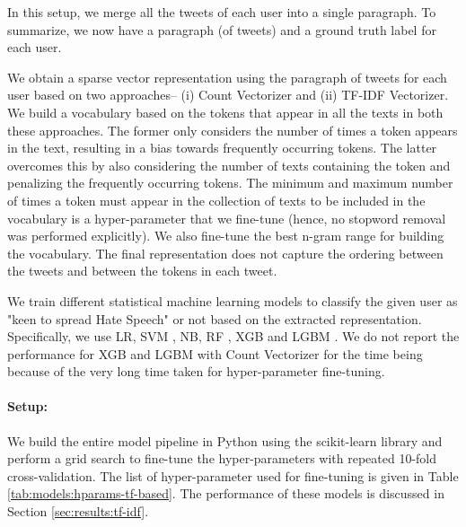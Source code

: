 In this setup, we merge all the tweets of each user into a single paragraph. To summarize, we now have a paragraph (of tweets) and a ground truth label for each user.

We obtain a sparse vector representation using the paragraph of tweets for each user based on two approaches-- (i) Count Vectorizer and (ii) \ac{TF-IDF} Vectorizer. We build a vocabulary based on the tokens that appear in all the texts in both these approaches. The former only considers the number of times a token appears in the text, resulting in a bias towards frequently occurring tokens. The latter overcomes this by also considering the number of texts containing the token and penalizing the frequently occurring tokens. The minimum and maximum number of times a token must appear in the collection of texts to be included in the vocabulary is a hyper-parameter that we fine-tune (hence, no stopword removal was performed explicitly). We also fine-tune the best n-gram range for building the vocabulary. The final representation does not capture the ordering between the tweets and between the tokens in each tweet.

We train different statistical machine learning models to classify the given user as "keen to spread Hate Speech" or not based on the extracted representation. Specifically, we use \ac{LR}, \ac{SVM} \cite{svm}, \ac{NB}, \ac{RF} \cite{rf}, \ac{XGB} \cite{xgboost} and \ac{LGBM} \cite{lightgbm}. We do not report the performance for \ac{XGB} and \ac{LGBM} with Count Vectorizer for the time being because of the very long time taken for hyper-parameter fine-tuning.

\paragraph{Setup:} We build the entire model pipeline in Python using the scikit-learn \cite{scikit-learn} library and perform a grid search to fine-tune the hyper-parameters with repeated 10-fold cross-validation. The list of hyper-parameter used for fine-tuning is given in Table \ref{tab:models:hparams-tf-based}. The performance of these models is discussed in Section \ref{sec:results:tf-idf}.

